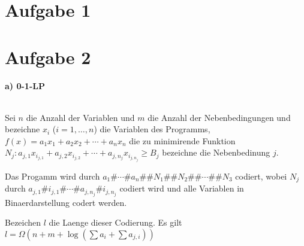 




\newcommand{\nr}{13}


\section*{Aufgabe 1}

\section*{Aufgabe 2}
\paragraph{a) 0-1-LP} $ $

Sei $n$ die Anzahl der Variablen und $m$ die Anzahl der Nebenbedingungen und
bezeichne $x_i$ ($i=1,\ldots,n$) die Variablen des Programms,
$f(x) = a_1 x_1 + a_2 x_2 + \cdots + a_n x_n$ die zu minimirende Funktion
$N_j: a_{j,1} x_{i_{j,1}} + a_{j,2} x_{i_{j,2}} + \cdots + a_{j,n_j} x_{i_{j,n_j}} \geq B_j$
bezeichne die Nebenbedinung $j$.

Das Progamm wird durch $a_1\#\cdots\#a_n\#\#N_1\#\#N_2\#\#\cdots\#\#N_3$ codiert,
wobei $N_j$ durch $a_{j,1}\#i_{j,1}\#\cdots\#a_{j,n_j}\#i_{j,n_j}$ codiert wird und 
alle Variablen in Binaerdarstellung codert werden.

Bezeichen $l$ die Laenge dieser Codierung. 
Es gilt $l = \Omega(n + m + \log(\sum a_i + \sum a_{j,i}))$

